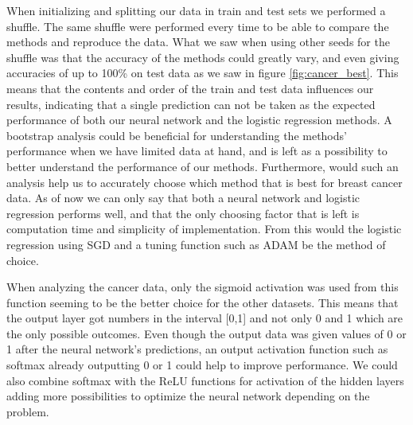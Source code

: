 \documentclass[11pt]{article}
\begin{document}
When initializing and splitting our data in train and test sets we performed a shuffle. The same shuffle were performed every time to be able to compare the methods and reproduce the data. What we saw when using other seeds for the shuffle was that the accuracy of the methods could greatly vary, and even giving accuracies of up to 100\% on test data as we saw in figure \ref{fig:cancer_best}. This means that the contents and order of the train and test data influences our results, indicating that a single prediction can not be taken as the expected performance of both our neural network and the logistic regression methods. A bootstrap analysis could be beneficial for understanding the methods' performance when we have limited data at hand, and is left as a possibility to better understand the performance of our methods. Furthermore, would such an analysis help us to accurately choose which method that is best for breast cancer data. As of now we can only say that both a neural network and logistic regression performs well, and that the only choosing factor that is left is computation time and simplicity of implementation. From this would the logistic regression using SGD and a tuning function such as ADAM be the method of choice.

When analyzing the cancer data, only the sigmoid activation was used from this function seeming to be the better choice for the other datasets.  This means that the output layer got numbers in the interval [0,1] and not only 0 and 1 which are the only possible outcomes. Even though the output data was given values of 0 or 1 after the neural network's predictions, an output activation function such as softmax already outputting 0 or 1 could help to improve performance. We could also combine softmax with the ReLU functions for activation of the hidden layers adding more possibilities to optimize the neural network depending on the problem.
\end{document}
